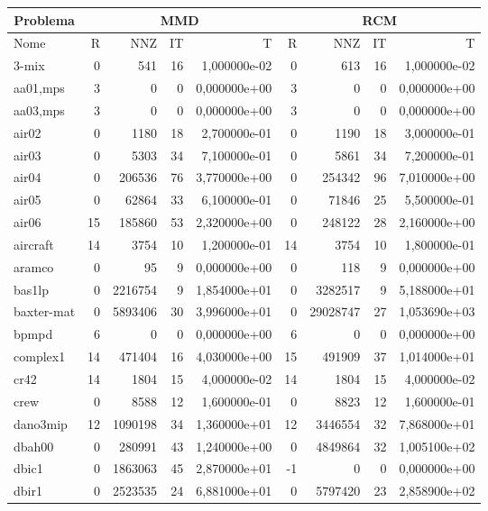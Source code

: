 \begin{tabular}{|l|r|r|r|r|r|r|r|r|}
\hline
\multicolumn{1}{|c|}{Problema} & \multicolumn{4}{|c|}{MMD} &         \multicolumn{4}{|c|}{RCM} \\ \hline
Nome & R & NNZ & IT & T & R & NNZ & IT & T \\ \hline
3-mix & 0 & 541 & 16 & 1,000000e-02 & 0 & 613 & 16 & 1,000000e-02 \\ \hline
aa01,mps & 3 & 0 & 0 & 0,000000e+00 & 3 & 0 & 0 & 0,000000e+00 \\ \hline
aa03,mps & 3 & 0 & 0 & 0,000000e+00 & 3 & 0 & 0 & 0,000000e+00 \\ \hline
air02 & 0 & 1180 & 18 & 2,700000e-01 & 0 & 1190 & 18 & 3,000000e-01 \\ \hline
air03 & 0 & 5303 & 34 & 7,100000e-01 & 0 & 5861 & 34 & 7,200000e-01 \\ \hline
air04 & 0 & 206536 & 76 & 3,770000e+00 & 0 & 254342 & 96 & 7,010000e+00 \\ \hline
air05 & 0 & 62864 & 33 & 6,100000e-01 & 0 & 71846 & 25 & 5,500000e-01 \\ \hline
air06 & 15 & 185860 & 53 & 2,320000e+00 & 0 & 248122 & 28 & 2,160000e+00 \\ \hline
aircraft & 14 & 3754 & 10 & 1,200000e-01 & 14 & 3754 & 10 & 1,800000e-01 \\ \hline
aramco & 0 & 95 & 9 & 0,000000e+00 & 0 & 118 & 9 & 0,000000e+00 \\ \hline
bas1lp & 0 & 2216754 & 9 & 1,854000e+01 & 0 & 3282517 & 9 & 5,188000e+01 \\ \hline
baxter-mat & 0 & 5893406 & 30 & 3,996000e+01 & 0 & 29028747 & 27 & 1,053690e+03 \\ \hline
bpmpd & 6 & 0 & 0 & 0,000000e+00 & 6 & 0 & 0 & 0,000000e+00 \\ \hline
complex1 & 14 & 471404 & 16 & 4,030000e+00 & 15 & 491909 & 37 & 1,014000e+01 \\ \hline
cr42 & 14 & 1804 & 15 & 4,000000e-02 & 14 & 1804 & 15 & 4,000000e-02 \\ \hline
crew & 0 & 8588 & 12 & 1,600000e-01 & 0 & 8823 & 12 & 1,600000e-01 \\ \hline
dano3mip & 12 & 1090198 & 34 & 1,360000e+01 & 12 & 3446554 & 32 & 7,868000e+01 \\ \hline
dbah00 & 0 & 280991 & 43 & 1,240000e+00 & 0 & 4849864 & 32 & 1,005100e+02 \\ \hline
dbic1 & 0 & 1863063 & 45 & 2,870000e+01 & -1 & 0 & 0 & 0,000000e+00 \\ \hline
dbir1 & 0 & 2523535 & 24 & 6,881000e+01 & 0 & 5797420 & 23 & 2,858900e+02 \\ \hline

\end{tabular}

